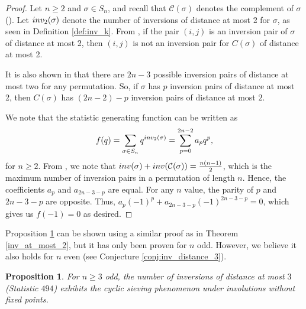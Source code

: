 \documentclass{amsart}
\newtheorem{prop}[thm]{Proposition}
\theoremstyle{definition}
\newcommand{\C}{\mathcal{C}} %
\newcommand{\inv}{\textnormal{inv}}
\begin{document}
\begin{proof}
  Let $n\geq 2$
  and $\sigma \in S_n$, and recall that $\mathcal{C}(\sigma)$ denotes the complement of $\sigma$ (). Let $\inv_2(\sigma)$ denote the number of inversions of distance at most 2 for $\sigma$, as seen in Definition \ref{def:inv_k}. From \cite[Proposition 5.28]{ELMSW22}, if the pair $(i, j)$ is an inversion pair of $\sigma$ of distance at most 2, then $(i,j)$ is not an inversion pair for $C(\sigma)$ of distance at most 2.

  It is also shown in \cite[Proposition 5.28]{ELMSW22} that there are $2n-3$ possible inversion pairs of distance at most two for any permutation. So, if $\sigma$ has $p$ inversion pairs of distance at most 2, then $C(\sigma)$ has $(2n-2) - p$ inversion pairs of distance at most $2$.

  We note that the statistic generating function can be written as
  \[
    f(q) = \sum_{\sigma \in S_n} q^{\inv_2(\sigma)} = \sum_{p=0}^{2n-2} a_p q^p,
  \]
  for $n\geq 2$.
From \cite[Proposition 5.16]{ELMSW22}, we note that $\inv(\sigma)+\inv (\C(\sigma)) = \frac{n(n-1)}{2}$, which is the maximum number of inversion pairs in a permutation of length $n$. Hence, the coefficients $a_{p}$ and $a_{2n-3-p}$ are equal.
  For any $n$ value, the parity of $p$ and $2n-3-p$ are opposite. Thus, $a_{p}(-1)^p + a_{2n-3-p}(-1)^{2n-3-p} = 0$, which gives us $f(-1) = 0$ as desired.
\end{proof}


Proposition \ref{thm:inv_distance_3} can be shown using a similar proof as in Theorem \ref{inv_at_most_2}, but it has only been proven for $n$ odd. However, we believe it also holds for $n$ even (see Conjecture \ref{conj:inv_distance_3}).


\begin{prop}\label{thm:inv_distance_3}
  For $n \geq 3$ odd, the number of inversions of distance at most $3$ (Statistic $494$) exhibits the cyclic sieving phenomenon under involutions without fixed points.
\end{prop}
\end{document}
